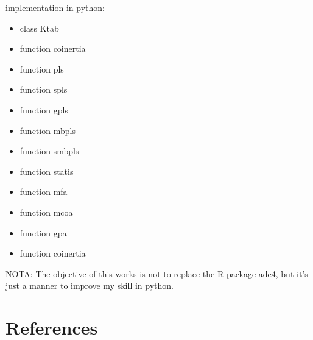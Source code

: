 \documentclass[
  10pt,
]{article}
\providecommand{\tightlist}{%
  \setlength{\itemsep}{0pt}\setlength{\parskip}{0pt}}
\begin{document}
implementation in python:

\begin{itemize}
\tightlist
\item
  class Ktab
\item
  function coinertia
\item
  function pls
\item
  function spls
\item
  function gpls
\item
  function mbpls
\item
  function smbpls
\item
  function statis
\item
  function mfa
\item
  function mcoa
\item
  function gpa
\item
  function coinertia
\end{itemize}

NOTA: The objective of this works is not to replace the R package ade4,
but it's just a manner to improve my skill in python.

\section{References}\label{references}
\end{document}
